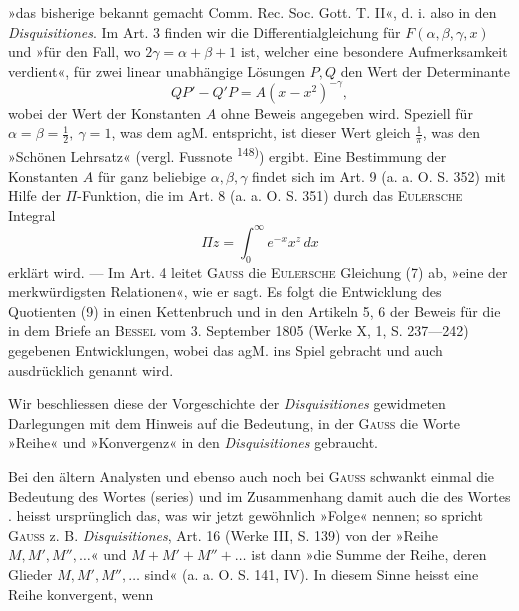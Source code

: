 »das bisherige bekannt gemacht Comm. Rec. Soc. Gott. T. II«, d. i. also in
den \textit{Disquisitiones}. Im Art. 3 finden wir die Differentialgleichung für \(F(\alpha,\beta,\gamma,x)\)
und »für den Fall, wo \(2\gamma=\alpha+\beta+1\) ist, welcher eine besondere Aufmerksamkeit
verdient«, für zwei linear unabhängige Lösungen \(P,Q\) den Wert der
Determinante
\begingroup\makeatletter\tagsleft@true\let\veqno\leqno\makeatother
\begin{equation*}
QP'-Q'P=A(x-x^2)^{-\gamma},\tag{11\,a}
\end{equation*}\endgroup
\noindent wobei der Wert der Konstanten \(A\) ohne Beweis angegeben wird. Speziell
für \(\alpha=\beta=\tfrac12,\ \gamma=1\), was dem agM. entspricht, ist dieser Wert gleich \(\frac1\pi\),
was den »Schönen Lehrsatz« (vergl. Fussnote \textsuperscript{148)}) ergibt. Eine Bestimmung
der Konstanten \(A\) für ganz beliebige \(\alpha,\beta,\gamma\) findet sich im Art. 9 (a. a. O.
S. 352) mit Hilfe der \(\Pi\)-Funktion, die im Art. 8 (a. a. O. S. 351) durch das
\textsc{Eulersche} Integral
\begingroup\makeatletter\tagsleft@true\let\veqno\leqno\makeatother
\begin{equation*}
\Pi z=\int_0^\infty e^{-x}x^z\,dx\tag{12}
\end{equation*}\endgroup
\noindent erklärt wird. — Im Art. 4 leitet \textsc{Gauss} die \textsc{Eulersche} Gleichung (7) ab, »eine
der merkwürdigsten Relationen«, wie er sagt. Es folgt die Entwicklung des
Quotienten (9) in einen Kettenbruch und in den Artikeln 5, 6 der Beweis
für die in dem Briefe an \textsc{Bessel} vom 3. September 1805 (Werke X, 1, S. 237—242)
gegebenen Entwicklungen, wobei das agM. ins Spiel gebracht und
auch ausdrücklich genannt wird.
\par
Wir beschliessen diese der Vorgeschichte der \textit{Disquisitiones} gewidmeten
Darlegungen mit dem Hinweis auf die Bedeutung, in der \textsc{Gauss} die Worte
»Reihe« und »Konvergenz« in den \textit{Disquisitiones} gebraucht.
\par
Bei den ältern Analysten und ebenso auch noch bei \textsc{Gauss} schwankt
einmal die Bedeutung des Wortes  (series) und im Zusammenhang damit
auch die des Wortes .  heisst ursprünglich das,
was wir jetzt gewöhnlich »Folge« nennen; so spricht \textsc{Gauss} z. B. \textit{Disquisitiones},
Art. 16 (Werke III, S. 139) von der »Reihe \(M,M',M'',\ldots\)« und \(M+M'+M''+\ldots\)
ist dann »die Summe der Reihe, deren Glieder \(M,M',M'',\ldots\) sind«
(a. a. O. S. 141, IV). In diesem Sinne heisst eine Reihe konvergent, wenn\par
